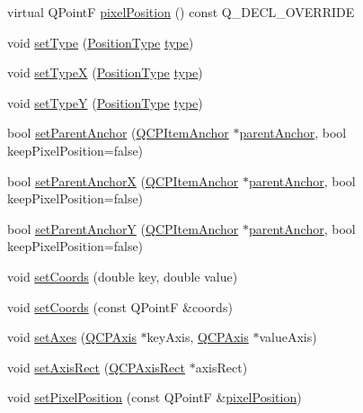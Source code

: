 \begin{DoxyCompactItemize}
\item 
virtual Q\+PointF \hyperlink{classQCPItemPosition_a8be9a4787635433edecc75164beb748d}{pixel\+Position} () const Q\+\_\+\+D\+E\+C\+L\+\_\+\+O\+V\+E\+R\+R\+I\+DE
\item 
void \hyperlink{classQCPItemPosition_aa476abf71ed8fa4c537457ebb1a754ad}{set\+Type} (\hyperlink{classQCPItemPosition_aad9936c22bf43e3d358552f6e86dbdc8}{Position\+Type} \hyperlink{classQCPItemPosition_aecb709d72c9aa334a7f62e2c9e0b5d60}{type})
\item 
void \hyperlink{classQCPItemPosition_a2113b2351d6d00457fb3559a4e20c3ea}{set\+TypeX} (\hyperlink{classQCPItemPosition_aad9936c22bf43e3d358552f6e86dbdc8}{Position\+Type} \hyperlink{classQCPItemPosition_aecb709d72c9aa334a7f62e2c9e0b5d60}{type})
\item 
void \hyperlink{classQCPItemPosition_ac2a454aa5a54c1615c50686601ec4510}{set\+TypeY} (\hyperlink{classQCPItemPosition_aad9936c22bf43e3d358552f6e86dbdc8}{Position\+Type} \hyperlink{classQCPItemPosition_aecb709d72c9aa334a7f62e2c9e0b5d60}{type})
\item 
bool \hyperlink{classQCPItemPosition_ac094d67a95d2dceafa0d50b9db3a7e51}{set\+Parent\+Anchor} (\hyperlink{classQCPItemAnchor}{Q\+C\+P\+Item\+Anchor} $\ast$\hyperlink{classQCPItemPosition_a7b4ffab9946945c0e11cd2352dc2e042}{parent\+Anchor}, bool keep\+Pixel\+Position=false)
\item 
bool \hyperlink{classQCPItemPosition_add71461a973927c74e42179480916d9c}{set\+Parent\+AnchorX} (\hyperlink{classQCPItemAnchor}{Q\+C\+P\+Item\+Anchor} $\ast$\hyperlink{classQCPItemPosition_a7b4ffab9946945c0e11cd2352dc2e042}{parent\+Anchor}, bool keep\+Pixel\+Position=false)
\item 
bool \hyperlink{classQCPItemPosition_add5ec1db9d19cec58a3b5c9e0a0c3f9d}{set\+Parent\+AnchorY} (\hyperlink{classQCPItemAnchor}{Q\+C\+P\+Item\+Anchor} $\ast$\hyperlink{classQCPItemPosition_a7b4ffab9946945c0e11cd2352dc2e042}{parent\+Anchor}, bool keep\+Pixel\+Position=false)
\item 
void \hyperlink{classQCPItemPosition_aa988ba4e87ab684c9021017dcaba945f}{set\+Coords} (double key, double value)
\item 
void \hyperlink{classQCPItemPosition_acc70b3abc143287f806e5f154e5e07b0}{set\+Coords} (const Q\+PointF \&coords)
\item 
void \hyperlink{classQCPItemPosition_a2185f45c75ac8cb9be89daeaaad50e37}{set\+Axes} (\hyperlink{classQCPAxis}{Q\+C\+P\+Axis} $\ast$key\+Axis, \hyperlink{classQCPAxis}{Q\+C\+P\+Axis} $\ast$value\+Axis)
\item 
void \hyperlink{classQCPItemPosition_a0cd9b326fb324710169e92e8ca0041c2}{set\+Axis\+Rect} (\hyperlink{classQCPAxisRect}{Q\+C\+P\+Axis\+Rect} $\ast$axis\+Rect)
\item 
void \hyperlink{classQCPItemPosition_a8d4f858f2089973967cf9cb81970ef0a}{set\+Pixel\+Position} (const Q\+PointF \&\hyperlink{classQCPItemPosition_a8be9a4787635433edecc75164beb748d}{pixel\+Position})
\end{DoxyCompactItemize}
